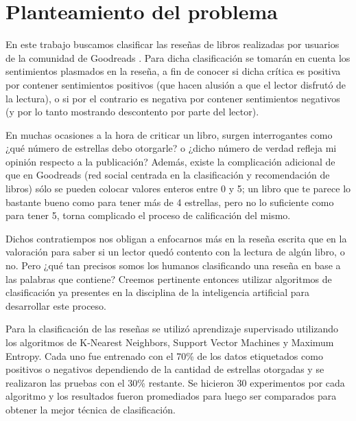 \documentclass[hidelinks]{sig-alternate-05-2015}
\begin{document}

\section{Planteamiento del problema}
En este trabajo buscamos clasificar las reseñas de libros realizadas por usuarios de la comunidad de Goodreads \cite{chandler:goodreads}. Para dicha clasificación se tomarán en cuenta los sentimientos plasmados en la reseña, a fin de conocer si dicha crítica es positiva por contener sentimientos positivos (que hacen alusión a que el lector disfrutó de la lectura), o si por el contrario es negativa por contener sentimientos negativos (y por lo tanto mostrando descontento por parte del lector).
    
En muchas ocasiones a la hora de criticar un libro, surgen interrogantes como ¿qué número de estrellas debo otorgarle? o ¿dicho número de verdad refleja mi opinión respecto a la publicación? Además, existe la complicación adicional de que en Goodreads (red social centrada en la clasificación y recomendación de libros) \cite{chandler:goodreads} sólo se pueden colocar valores enteros entre 0 y 5; un libro que te parece lo bastante bueno como para tener más de 4 estrellas, pero no lo suficiente como para tener 5, torna complicado el proceso de calificación del mismo. 

Dichos contratiempos nos obligan a enfocarnos más en la reseña escrita que en la valoración para saber si un lector quedó contento con la lectura de algún libro, o no. Pero ¿qué tan precisos somos los humanos clasificando una reseña en base a las palabras que contiene? Creemos pertinente entonces utilizar algoritmos de clasificación ya presentes en la disciplina de la inteligencia artificial para desarrollar este proceso.

Para la clasificación de las reseñas se utilizó aprendizaje supervisado utilizando los algoritmos de K-Nearest Neighbors, Support Vector Machines y Maximum Entropy. Cada uno fue entrenado con el 70\% de los datos etiquetados como positivos o negativos dependiendo de la cantidad de estrellas otorgadas y se realizaron las pruebas con el 30\% restante. Se hicieron 30 experimentos por cada algoritmo y los resultados fueron promediados para luego ser comparados para obtener la mejor técnica de clasificación.
\end{document}
